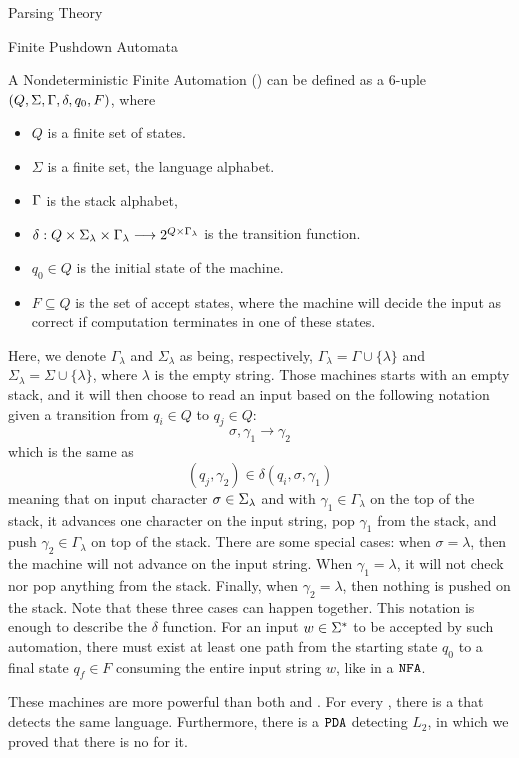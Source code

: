 \begin{section}{Parsing Theory}
\begin{subsection}{Finite Pushdown Automata}
\begin{definition}
A Nondeterministic Finite Automation () can be defined as a 6-uple
$(Q, \Sigma, \Gamma, \delta, q_0, F)$, where
\begin{itemize}

\item $Q$ is a finite set of states.
\item $\Sigma$ is a finite set, the language alphabet.
\item $\Gamma$ is the stack alphabet,
\item $\delta:Q\times\Sigma_\lambda \times \Gamma_\lambda \longrightarrow 2^{Q \times \Gamma_\lambda}$ is the transition function.
\item $q_0 \in Q$ is the initial state of the machine.
\item $F \subseteq Q$ is the set of accept states, where the machine will
decide the input as correct if computation terminates in one of these
states.
\end{itemize}
\end{definition}
Here, we denote $\Gamma_\lambda$ and $\Sigma_\lambda$ as being, respectively,
$\Gamma_\lambda = \Gamma \cup \{\lambda\}$ and $\Sigma_\lambda = \Sigma \cup
\{\lambda\}$, where $\lambda$ is the empty string. Those machines starts with
an empty stack, and it will then choose to read an input based on the following
notation given a transition from $q_i \in Q$ to $q_j \in Q$: $$\sigma, \gamma_1
\rightarrow \gamma_2$$ which is the same as $$(q_j, \gamma_2) \in \delta(q_i,
\sigma, \gamma_1)$$ meaning that on input character $\sigma \in \Sigma_\lambda$
and with $\gamma_1 \in \Gamma_\lambda$ on the top of the stack, it advances one
character on the input string, pop $\gamma_1$ from the stack, and push
$\gamma_2 \in \Gamma_\lambda$ on top of the stack. There are some special
cases: when $\sigma = \lambda$, then the machine will not advance on the input
string. When $\gamma_1 = \lambda$, it will not check nor pop anything from the
stack. Finally, when $\gamma_2 = \lambda$, then nothing is pushed on the stack.
Note that these three cases can happen together. This notation is enough to
describe the $\delta$ function.  For an input $w \in \Sigma^*$ to be accepted by
such automation, there must exist at least one path from the starting state
$q_0$ to a final state $q_f \in F$ consuming the entire input string $w$, like
in a $\texttt{NFA}$.

These machines are more powerful than both  and .
For every , there is a  that detects the same language.
Furthermore, there is a $\texttt{PDA}$ detecting $L_2$, in
which we proved that there is no  for it.


\end{subsection}
\end{section}
